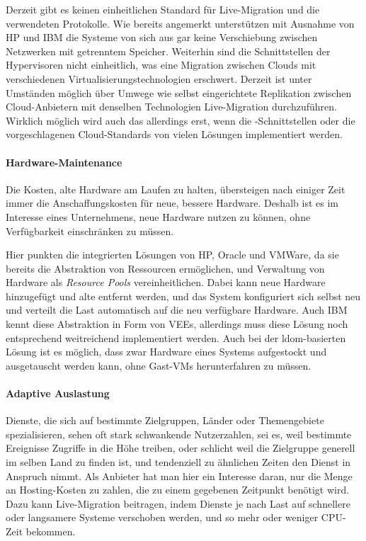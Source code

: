Derzeit gibt es keinen einheitlichen Standard für Live-Migration und
die verwendeten Protokolle. Wie bereits angemerkt unterstützen mit
Ausnahme von HP und IBM die Systeme von sich aus gar keine
Verschiebung zwischen Netzwerken mit getrenntem Speicher. Weiterhin
sind die Schnittstellen der Hypervisoren nicht einheitlich,
was eine Migration zwischen Clouds mit verschiedenen
Virtualisierungstechnologien erschwert. Derzeit ist unter Umständen
möglich über Umwege wie selbst eingerichtete Replikation zwischen
Cloud-Anbietern mit denselben Technologien Live-Migration
durchzuführen. Wirklich möglich wird auch das allerdings erst, wenn
die \reservoir-Schnittstellen oder die vorgeschlagenen Cloud-Standards
von vielen Lösungen implementiert werden.

\paragraph*{Hardware-Maintenance}
Die Kosten, alte Hardware am Laufen zu halten, übersteigen nach einiger
Zeit immer die Anschaffungskosten für neue, bessere Hardware. Deshalb
ist es im Interesse eines Unternehmens, neue Hardware nutzen zu
können, ohne Verfügbarkeit einschränken zu müssen.

Hier punkten die integrierten Lösungen von HP, Oracle und VMWare, da
sie bereits die Abstraktion von Ressourcen ermöglichen, und Verwaltung
von Hardware als \emph{Resource Pools} vereinheitlichen. Dabei kann
neue Hardware hinzugefügt und alte entfernt werden, und das System
konfiguriert sich selbst neu und verteilt die Last automatisch auf die
neu verfügbare Hardware. Auch IBM kennt diese Abstraktion in Form von
\acp{VEE}, allerdings muss diese Lösung noch entsprechend weitreichend
implementiert werden. Auch bei der \ac{ldom}-basierten Lösung ist es
möglich, dass zwar Hardware eines Systems aufgestockt und ausgetauscht
werden kann, ohne Gast-\ac{VM}s herunterfahren zu müssen.

\paragraph*{Adaptive Auslastung}
Dienste, die sich auf bestimmte Zielgruppen, Länder oder Themengebiete
spezialisieren, sehen oft stark schwankende Nutzerzahlen, sei es, weil
bestimmte Ereignisse Zugriffe in die Höhe treiben, oder schlicht weil
die Zielgruppe generell im selben Land zu finden ist, und tendenziell
zu ähnlichen Zeiten den Dienst in Anspruch nimmt. Als Anbieter hat man
hier ein Interesse daran, nur die Menge an Hosting-Kosten zu zahlen,
die zu einem gegebenen Zeitpunkt benötigt wird. Dazu kann
Live-Migration beitragen, indem Dienste je nach Last auf schnellere
oder langsamere Systeme verschoben werden, und so mehr oder weniger
CPU-Zeit bekommen.

